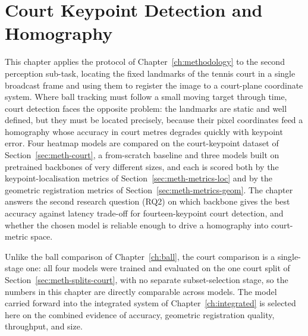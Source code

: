 \chapter{Court Keypoint Detection and Homography}
\label{ch:court}


This chapter applies the protocol of Chapter~\ref{ch:methodology} to the second
perception sub-task, locating the fixed landmarks of the tennis court in a single
broadcast frame and using them to register the image to a court-plane coordinate
system. Where ball tracking must follow a small moving target through time, court
detection faces the opposite problem: the landmarks are static and well defined,
but they must be located precisely, because their pixel coordinates feed a
homography whose accuracy in court metres degrades quickly with keypoint error.
Four heatmap models are compared on the court-keypoint dataset of
Section~\ref{sec:meth-court}, a from-scratch baseline and three models built on
pretrained backbones of very different sizes, and each is scored both by the
keypoint-localisation metrics of Section~\ref{sec:meth-metrics-loc} and by the
geometric registration metrics of Section~\ref{sec:meth-metrics-geom}. The
chapter answers the second research question (RQ2) on which backbone gives the
best accuracy against latency trade-off for fourteen-keypoint court detection,
and whether the chosen model is reliable enough to drive a homography into
court-metric space.

Unlike the ball comparison of Chapter~\ref{ch:ball}, the court comparison is a
single-stage one: all four models were trained and evaluated on the one court
split of Section~\ref{sec:meth-splits-court}, with no separate subset-selection
stage, so the numbers in this chapter are directly comparable across models. The
model carried forward into the integrated system of
Chapter~\ref{ch:integrated} is selected here on the combined evidence of accuracy,
geometric registration quality, throughput, and size.

